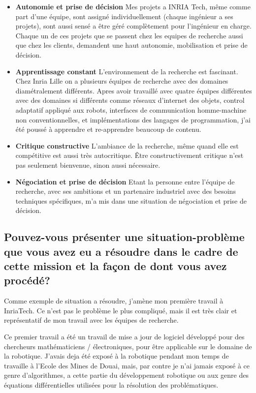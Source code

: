 \documentclass{resume} %
\begin{document}
			\begin{itemize} 				
			\item \textbf{Autonomie et prise de décision} \newline
				Mes projets a INRIA Tech, même comme part d'une équipe, sont assigné individuellement (chaque ingénieur a ses projets), sont aussi sensé a être géré complètement pour l'ingénieur en charge. Chaque un de ces projets que se passent chez les equipes de recherche aussi que chez les clients, demandent une haut autonomie, mobilisation et prise de décision.
				\item \textbf{Apprentissage constant } \newline
				L'environnement de la recherche est fascinant. Chez Inria Lille on a plusieurs équipes de recherche avec des domaines diamétralement différents. Apres avoir travaillé avec quatre équipes différentes avec des domaines si différents comme réseaux d'internet des objets, control adaptatif appliqué aux robots,  interfaces de communication homme-machine non conventionnelles, et implémentations des langages de programmation, j'ai été poussé à apprendre et re-apprendre beaucoup de contenu. 
			\item \textbf{Critique constructive} \newline
				L'ambiance de la recherche, même quand elle est compétitive est aussi très autocritique. Être constructivement critique n'est pas seulement bienvenue, sinon aussi nécessaire.
			\item \textbf{Négociation et prise de décision } \newline
		Etant la personne entre l'équipe de recherche, avec ses ambitions et un partenaire industriel avec des besoins techniques spécifiques, m'a mis dans une situation de négociation  et prise de décision. 
		\end{itemize}

		
	\subsection{Pouvez-vous présenter une situation-problème que vous avez eu a résoudre dans le cadre de cette mission et la façon de dont vous avez procédé?}
	
		Comme exemple de situation a résoudre, j'amène mon première travail à InriaTech. Ce n'est pas le problème le plus compliqué, mais il est très clair et représentatif de mon travail avec les équipes de recherche.  
		
		 Ce premier travail a été un travail de mise a jour de logiciel développé pour des chercheurs mathématiciens / électroniques, pour être applicable sur le domaine de la robotique. 
		J'avais deja été exposé à la robotique pendant mon temps de travaille à l'Ecole des Mines de Douai, mais, par contre je n'ai jamais exposé à ce genre d'algorithmes, a cette partie du développement robotique ou aux genre des équations différentielles utilisées pour la résolution des problématiques. 
		
\end{document}
